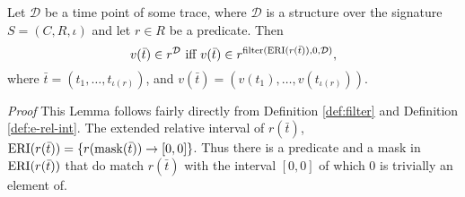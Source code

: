 

\begin{lemma}
    \label{lem:eri-predicate-satisfaction1}
    Let $\mathcal{D}$ be a time point of some trace, where $\mathcal{D}$ is a structure over the signature $S = (C,R,\iota)$ and let $r \in R$ be a predicate. 
    Then 
    \begin{equation*}
        v(\bar{t}) \in r^{\mathcal{D}}
        \text{ iff }
        v(\bar{t}) \in r^{\operatorname{filter}(\operatorname{ERI}(r(\bar{t})), 0, \mathcal{D})},
    \end{equation*}
    where $\bar{t} = (t_1, \dots, t_{\iota(r)})$, and $v(\bar{t}) = (v(t_1), \dots, v(t_{\iota(r)}))$.
\end{lemma}
\textit{Proof} 
This Lemma follows fairly directly from Definition \ref{def:filter} and Definition \ref{def:e-rel-int}.
The extended relative interval of $r(\bar{t})$, $\operatorname{ERI}(r(\bar{t})) = \{r(\operatorname{mask}(\bar{t})) \to [0,0]\}$.
Thus there is a predicate and a mask in $\operatorname{ERI}(r(\bar{t}))$ that do match $r(\bar{t})$ with the interval $[0,0]$ of which $0$ is trivially an element of.


